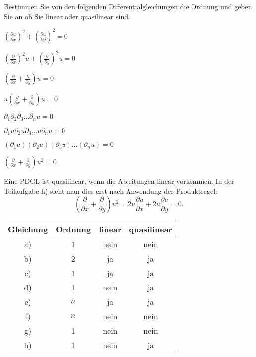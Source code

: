 Bestimmen Sie von den folgenden Differentialgleichungen die Ordnung
und geben Sie an ob Sie linear oder quasilinear sind.
\begin{teilaufgaben}
\item $\displaystyle \left(\frac{\partial u}{\partial x}\right)^2+\left(\frac{\partial u}{\partial y}\right)^2=0$
\item $\displaystyle
\left(\frac{\partial}{\partial x}\right)^2u+\left(\frac{\partial}{\partial y}\right)^2u=0$
\item $\displaystyle
\left(\frac{\partial}{\partial x}+\frac{\partial}{\partial y}\right)u=0
$
\item $\displaystyle
u\left(\frac{\partial}{\partial x}+\frac{\partial}{\partial y}\right)u=0
$
\item $\displaystyle
\partial_1\partial_2\partial_3\dots\partial_n u=0
$
\item $\displaystyle
\partial_1u\partial_2u\partial_3\dots u\partial_n u=0
$
\item $\displaystyle
(\partial_1u)(\partial_2u)(\partial_3u)\dots (\partial_n u)=0
$
\item $\displaystyle
\left(\frac{\partial}{\partial x}+\frac{\partial}{\partial y}\right)u^2=0
$
\end{teilaufgaben}

\begin{loesung}
Eine PDGL ist quasilinear, wenn die Ableitungen linear vorkommen.
In der Teilaufgabe h) sieht man dies erst nach Anwendung der Produktregel:
\[
\left(\frac{\partial}{\partial x}+\frac{\partial}{\partial y}\right)u^2
=
2u\frac{\partial u}{\partial x}+2u\frac{\partial u}{\partial y}=0.
\]
\begin{center}
\begin{tabular}{|c|c|c|c|}
\hline
Gleichung&Ordnung&linear&quasilinear\\
\hline
a)&1&nein&nein\\
b)&2&ja&ja\\
c)&1&ja&ja\\
d)&1&nein&ja\\
e)&$n$&ja&ja\\
f)&$n$&nein&nein\\
g)&1&nein&nein\\
h)&1&nein&ja\\
\hline
\end{tabular}
\end{center}
\end{loesung}
